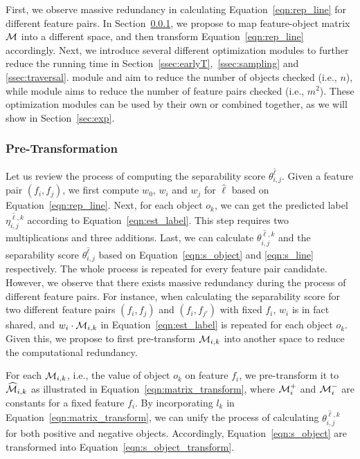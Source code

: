 First, we observe massive redundancy in calculating Equation~\ref{eqn:rep_line} for different feature pairs. In Section~\ref{ssec:trans}, we propose to map feature-object matrix $\mm$ into a different space, and then transform Equation~\ref{eqn:rep_line} accordingly. Next, we introduce several different optimization modules to further reduce the running time in Section~\ref{ssec:earlyT},~\ref{ssec:sampling} and \ref{ssec:traversal}. module \earlyT and \sampling aim to reduce the number of objects checked (i.e., $n$), while module \traversal aims to reduce the number of feature pairs checked (i.e., $m^2$). These optimization modules can be used by their own or combined together, as we will show in Section~\ref{sec:exp}. 

\subsubsection{Pre-Transformation} \label{ssec:trans}
 Let us review the process of computing the separability score $\theta_{i,j}^{\hat{\ell}}$. Given a feature pair $(f_i,f_j)$, we first compute $w_0$, $w_i$ and $w_j$ for $\hat{\ell}$ based on Equation~\ref{eqn:rep_line}. Next, for each object $o_k$, we can get the predicted label $\eta_{i,j}^{\hat{\ell},k}$ according to Equation~\ref{eqn:est_label}. This step requires two multiplications and three additions. Last, we can calculate $\theta_{i,j}^{\hat{\ell},k}$ and the separability score $\theta_{i,j}^{\hat{\ell}}$ based on Equation~\ref{eqn:s_object} and \ref{eqn:s_line} respectively. The whole process is repeated for every feature pair candidate. However, we observe that there exists massive redundancy during the process of different feature pairs. For instance, when calculating the separability score for two different feature pairs $(f_i,f_j)$ and $(f_i,f_{j'})$ with fixed $f_i$, $w_i$ is in fact shared, and $w_i\cdot \mm_{i,k}$ in Equation~\ref{eqn:est_label} is repeated for each object $o_k$. Given this, we propose to first pre-transform $\mm_{i,k}$ into another space to reduce the computational redundancy.

 For each $\mm_{i,k}$, i.e., the value of object $o_k$ on feature $f_i$, we pre-transform it to $\widehat{\mm}_{i,k}$ as illustrated in Equation~\ref{eqn:matrix_transform}, where $\mm_i^+$ and $\mm_i^-$ are constants for a fixed feature $f_i$. By incorporating $l_k$ in Equation~\ref{eqn:matrix_transform}, we can unify the process of calculating $\theta_{i,j}^{\hat{\ell},k}$ for both positive and negative objects. Accordingly, Equation~\ref{eqn:s_object} are transformed into Equation~\ref{eqn:s_object_transform}.

